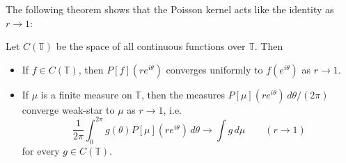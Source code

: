 The following theorem shows that the Poisson kernel acts like the identity as $r\rightarrow 1$:
\begin{theorem}\label{Poisson approximate identity}
Let $C(\mathbb{T})$ be the space of all continuous functions over $\mathbb{T}$. Then
\begin{itemize}
  \item[(a)] If $f\in C(\mathbb{T})$, then $P[f](re^{i\theta})$ converges uniformly to $f(e^{i\theta})$
  as $r\rightarrow 1$.
  \item[(b)] If $\mu$ is a finite measure on $\mathbb{T}$, then the measures
  $P[\mu](re^{i\theta})\, d\theta/(2\pi)$ converge weak-star to $\mu$ as $r\rightarrow 1$, i.e.
  \begin{equation*}
    \frac{1}{2\pi}\int_0^{2\pi} g(\theta)P[\mu](re^{i\theta})\, d\theta\rightarrow\int g\, d\mu
    \qquad (r\rightarrow 1)
  \end{equation*}
  for every $g\in C(\mathbb{T})$.
\end{itemize}
\end{theorem}
